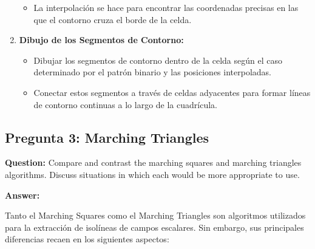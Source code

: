 \documentclass{article}
\begin{document}
\begin{enumerate}
\begin{itemize}
        \item La interpolación se hace para encontrar las coordenadas precisas en las que el contorno cruza el borde de la celda.
    \end{itemize}
    \item \textbf{Dibujo de los Segmentos de Contorno:}
    \begin{itemize}
        \item Dibujar los segmentos de contorno dentro de la celda según el caso determinado por el patrón binario y las posiciones interpoladas.
        \item Conectar estos segmentos a través de celdas adyacentes para formar líneas de contorno continuas a lo largo de la cuadrícula.
    \end{itemize}
\end{enumerate}

\subsection{Pregunta 3: Marching Triangles}

\textbf{Question:} Compare and contrast the marching squares and marching triangles algorithms. Discuss situations in which each would be more appropriate to use.

\textbf{Answer:}

Tanto el Marching Squares como el Marching Triangles son algoritmos utilizados para la extracción de isolíneas de campos escalares. Sin embargo, sus principales diferencias recaen en los siguientes aspectos:
\end{document}
